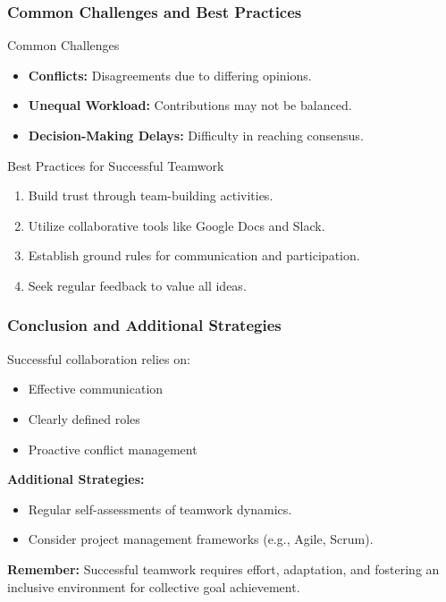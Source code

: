 \documentclass[aspectratio=169]{beamer}
\begin{document}
\begin{frame}[fragile]
    \frametitle{Common Challenges and Best Practices}
    \begin{block}{Common Challenges}
        \begin{itemize}
            \item \textbf{Conflicts:} Disagreements due to differing opinions.
            \item \textbf{Unequal Workload:} Contributions may not be balanced.
            \item \textbf{Decision-Making Delays:} Difficulty in reaching consensus.
        \end{itemize}
    \end{block}

    \begin{block}{Best Practices for Successful Teamwork}
        \begin{enumerate}
            \item Build trust through team-building activities.
            \item Utilize collaborative tools like Google Docs and Slack.
            \item Establish ground rules for communication and participation.
            \item Seek regular feedback to value all ideas.
        \end{enumerate}
    \end{block}
\end{frame}

\begin{frame}[fragile]
    \frametitle{Conclusion and Additional Strategies}
    Successful collaboration relies on:
    \begin{itemize}
        \item Effective communication
        \item Clearly defined roles
        \item Proactive conflict management
    \end{itemize}

    \textbf{Additional Strategies:}
    \begin{itemize}
        \item Regular self-assessments of teamwork dynamics.
        \item Consider project management frameworks (e.g., Agile, Scrum).
    \end{itemize}
    
    \textbf{Remember:} Successful teamwork requires effort, adaptation, and fostering an inclusive environment for collective goal achievement.
\end{frame}
\end{document}
